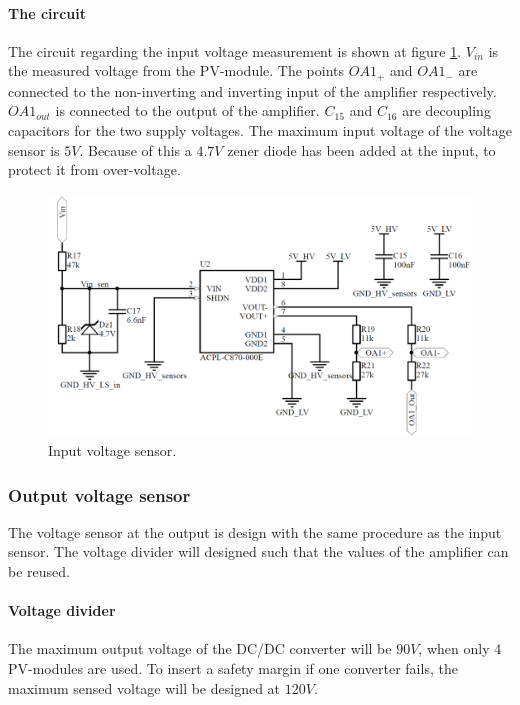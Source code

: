 \paragraph{The circuit}
The circuit regarding the input voltage measurement is shown at figure \ref{fig:input_voltage_sensor_circuit}. $V_{in}$ is the measured voltage from the PV-module. The points $OA1_+$ and $OA1_-$ are connected to the non-inverting and inverting input of the amplifier respectively. $OA1_{out}$ is connected to the output of the amplifier. $C_{15}$ and $C_{16}$ are decoupling capacitors for the two supply voltages. The maximum input voltage of the voltage sensor is $5V$. Because of this a $4.7V$ zener diode has been added at the input, to protect it from over-voltage.

\begin{figure}[H]
	\begin{center}
		\includegraphics[width=0.7\linewidth]{../Pictures/P1/Sensors/input_voltage_sensor.PNG}
		\caption{Input voltage sensor.}
		\label{fig:input_voltage_sensor_circuit}
	\end{center}
\end{figure}

\subsubsection{Output voltage sensor}
The voltage sensor at the output is design with the same procedure as the input sensor. The voltage divider will designed such that the values of the amplifier can be reused.

\paragraph{Voltage divider}
The maximum output voltage of the DC/DC converter will be $90V$, when only 4 PV-modules are used. To insert a safety margin if one converter fails, the maximum sensed voltage will be designed at $120V$.

